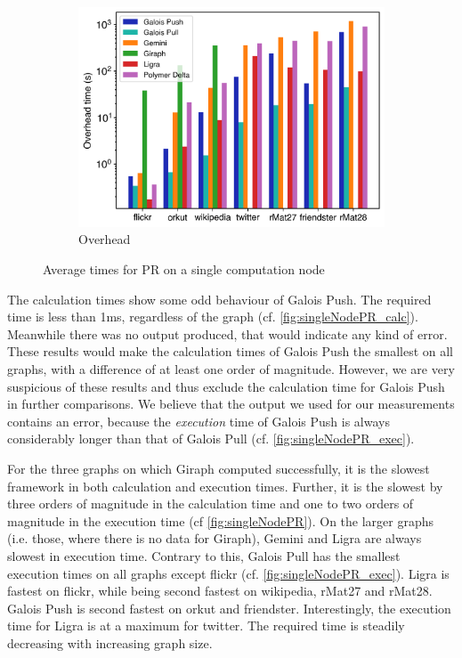 \begin{figure}
\begin{subfigure}{0.32\textwidth}
		\includegraphics[width=\linewidth]{../../plots/singleNodePR_overheadTIme.png}
		\caption{Overhead}
		\label{fig:singleNodePR_overhead}
	\end{subfigure}
	\hfil
	\caption{Average times for PR on a single computation node}
	\label{fig:singleNodePR}
\end{figure}

The calculation times show some odd behaviour of Galois Push. The required time is less than 1ms, regardless of the graph (cf. \autoref{fig:singleNodePR_calc}). Meanwhile there was no output produced, that would indicate any kind of error. These results would make the calculation times of Galois Push the smallest on all graphs, with a difference of at least one order of magnitude. However, we are very suspicious of these results and thus exclude the calculation time for Galois Push in further comparisons. 
We believe that the output we used for our measurements contains an error,
because the \emph{execution} time of Galois Push is always considerably longer than that of Galois Pull (cf. \autoref{fig:singleNodePR_exec}).

For the three graphs on which Giraph computed successfully, it is the slowest framework in both calculation and execution times. Further, it is the slowest by three orders of magnitude in the calculation time and one to two orders of magnitude in the execution time (cf \autoref{fig:singleNodePR}). On the larger graphs (i.e. those, where there is no data for Giraph), Gemini and Ligra are always slowest in execution time.
Contrary to this, Galois Pull has the smallest execution times on all graphs except flickr (cf. \autoref{fig:singleNodePR_exec}). Ligra is fastest on flickr, while being second fastest on wikipedia, rMat27 and rMat28. Galois Push is second fastest on orkut and friendster.
Interestingly, the execution time for Ligra is at a maximum for twitter. The required time is steadily decreasing with increasing graph size.



